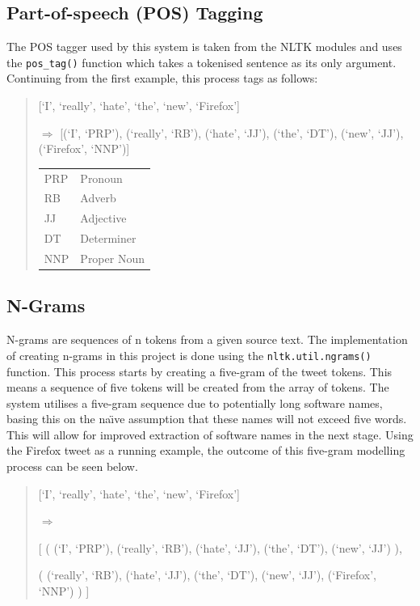 \subsection{Part-of-speech (POS) Tagging}
The POS tagger used by this system is taken from the NLTK modules and uses the \texttt{pos\_tag()} function which takes a tokenised sentence as its only argument. Continuing from the first example, this process tags as follows: 
\begin{quote}
[`I', `really', `hate', `the', `new', `Firefox']

\begin{math}\Rightarrow\end{math}
[(`I', `PRP'), (`really', `RB'), (`hate', `JJ'), (`the', `DT'), (`new', `JJ'), (`Firefox', `NNP')]

\begin{center}
\begin{tabular}{ l | l }
  \hline                        
  PRP & Pronoun \\
  RB & Adverb \\
  JJ & Adjective \\
  DT & Determiner \\
  NNP & Proper Noun \\
  \hline  
\end{tabular}
\end{center}
\end{quote}

\subsection{N-Grams}
N-grams are sequences of n tokens from a given source text. The implementation of creating n-grams in this project is done using the \texttt{nltk.util.ngrams()} function. This process starts by creating a five-gram of the tweet tokens. This means a sequence of five tokens will be created from the array of tokens. The system utilises a five-gram sequence due to potentially long software names, basing this on the na\"{\i}ve assumption that these names will not exceed five words. This will allow for improved extraction of software names in the next stage. Using the Firefox tweet as a running example, the outcome of this five-gram modelling process can be seen below.

\begin{quote}
[`I', `really', `hate', `the', `new', `Firefox']

\begin{math}\Rightarrow\end{math}

[
 ( (`I', `PRP'), (`really', `RB'), (`hate', `JJ'), (`the', `DT'), (`new', `JJ') ),

 ( (`really', `RB'), (`hate', `JJ'), (`the', `DT'), (`new', `JJ'), (`Firefox', `NNP') )
]
\end{quote}

